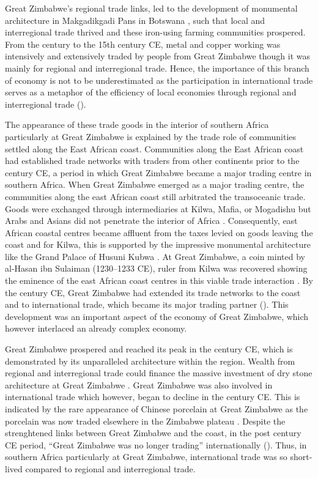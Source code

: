 Great Zimbabwe’s regional trade links, led to the development of monumental architecture in Makgadikgadi Pans in Botswana \parencite{pikirayi2017}, such that local and interregional trade thrived and these iron-using farming communities prospered. From the  century to the 15th century CE, metal and copper working was intensively and extensively traded by people from Great Zimbabwe \parencite{garlake1973} though it was mainly for regional and interregional trade. Hence, the importance of this branch of economy is not to be underestimated as the participation in international trade serves as a metaphor of  the efficiency of local economies through regional and interregional trade (\cites{pwiti1991}{pwiti2005}{manyanga2006}{pikirayi2006}).

The appearance of these trade goods in the interior of southern Africa particularly at Great Zimbabwe is explained by the trade role of  communities settled along the East African coast. Communities along the East African coast had established trade networks with traders from other continents prior to the  century CE,
a period in which Great Zimbabwe became a major trading centre in southern Africa. When Great Zimbabwe emerged as a major trading centre, the communities along the east African coast still arbitrated the transoceanic trade. Goods were exchanged through intermediaries at Kilwa, Mafia, or Mogadishu but Arabs and Asians did not penetrate the interior of Africa \parencite{alradi1990}. Consequently, east African coastal centres became affluent from the taxes levied on goods leaving the coast \parencite{alradi1990} and for Kilwa, this is supported by the impressive monumental architecture like the Grand Palace of Husuni Kubwa \parencite{pikirayi2006}.
At Great Zimbabwe, a coin minted by al-Hasan ibn Sulaiman (1230--1233 CE), ruler from Kilwa was recovered showing the eminence of the east African coast centres in this viable trade interaction
\parencite{pikirayi2006}. By the  century CE, Great Zimbabwe had extended its trade networks to the coast and to international trade, which became its major trading partner (\cites{pwiti2005}{kusimba2007}{kim2008}). This development was an important aspect of the economy of Great Zimbabwe, which however interlaced an already complex economy.

Great Zimbabwe prospered and reached its peak in the  century CE, which is demonstrated by its unparalleled architecture within the region. Wealth from regional and interregional trade could finance the massive investment of dry stone architecture at Great Zimbabwe \parencite{kim2008}.
Great Zimbabwe was also involved in international trade which however, began to decline in the  century CE. This is indicated by the rare appearance of Chinese porcelain at Great Zimbabwe as the porcelain was now traded elsewhere in the Zimbabwe plateau \parencite{pikirayi2006}.
Despite the strenghtened links between Great Zimbabwe and the coast, in the post  century CE period, \enquote{Great Zimbabwe was no longer trading} internationally (\cite[][135]{garlake1973}). Thus, in southern Africa particularly at Great Zimbabwe, international trade was so short-lived compared to regional and interregional trade.

